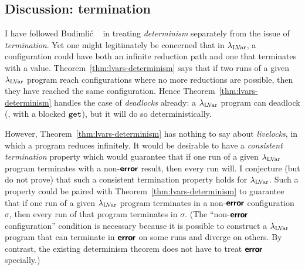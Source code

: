 \subsection{Discussion: termination}

I have followed Budimli\'c \etal~\cite{CnC} in treating
\emph{determinism} separately from the issue of \emph{termination}.
Yet one might legitimately be concerned that in $\lambda_{\textrm{LVar}}$, a
configuration could have both an infinite reduction path and one that
terminates with a value.  Theorem~\ref{thm:lvars-determinism} says
that if two runs of a given $\lambda_{\textrm{LVar}}$ program reach configurations
where no more reductions are possible, then they have reached the same
configuration.  Hence Theorem~\ref{thm:lvars-determinism} handles the
case of \emph{deadlocks} already: a $\lambda_{\textrm{LVar}}$ program can deadlock
(\eg, with a blocked $\mbox{\texttt{get}}$), but it will do so deterministically.

However, Theorem~\ref{thm:lvars-determinism} has nothing to say about
\emph{livelocks}, in which a program reduces infinitely.  It would be
desirable to have a \emph{consistent termination} property which would
guarantee that if one run of a given $\lambda_{\textrm{LVar}}$ program terminates
with a non-$\textbf{\textsf{error}}$ result, then every run will.  I conjecture (but do
not prove) that such a consistent termination property holds for
$\lambda_{\textrm{LVar}}$.  Such a property could be paired with
Theorem~\ref{thm:lvars-determinism} to guarantee that if one run of a
given $\lambda_{\textrm{LVar}}$ program terminates in a non-$\textbf{\textsf{error}}$ configuration
$\sigma$, then every run of that program terminates in $\sigma$.  (The
``non-$\textbf{\textsf{error}}$ configuration'' condition is necessary because it is
possible to construct a $\lambda_{\textrm{LVar}}$ program that can terminate in
$\textbf{\textsf{error}}$ on some runs and diverge on others.  By contrast, the
existing determinism theorem does not have to treat $\textbf{\textsf{error}}$
specially.)
